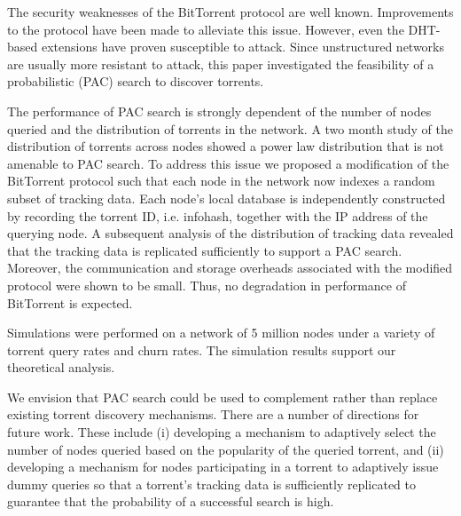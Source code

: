 The security weaknesses of the BitTorrent protocol are well known. Improvements to the protocol have been made to alleviate this issue. However, even the DHT-based extensions have proven susceptible to attack.  Since unstructured networks are usually more resistant to attack, this paper investigated the feasibility of a probabilistic (PAC) search to discover torrents.  

The performance of PAC search is strongly dependent of the number of nodes queried and the distribution of torrents in the network. A two month study of the distribution of torrents across nodes showed a power law distribution that is not amenable to PAC search. To address this issue we proposed a modification of the BitTorrent protocol such that each node in the network now indexes a random subset of tracking data. Each node's local database is independently constructed by recording the torrent ID, i.e. infohash, together with the IP address of the querying node. A subsequent analysis of the distribution of tracking data revealed that the tracking data is replicated sufficiently to support a PAC search. Moreover, the communication and storage overheads associated with the modified protocol were shown to be small. Thus, no degradation in performance of BitTorrent is expected.

Simulations were performed on a network of 5 million nodes under a variety of torrent query rates and churn rates. The simulation results support our theoretical analysis.
  
We envision that PAC search could be used to complement rather than replace existing torrent discovery mechanisms. There are a number of directions for future work. These include (i) developing a mechanism to adaptively select the number of nodes queried based on the popularity of the queried torrent, and (ii) developing a mechanism for nodes participating in a torrent to adaptively issue dummy queries so that a torrent's tracking data is sufficiently replicated to guarantee that the probability of a successful search is high.